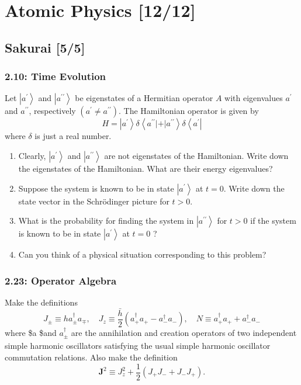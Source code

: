 \documentclass[11pt]{article}
\begin{document}
\section{Atomic Physics [12/12]}
\label{sec:org9dfb86c}
\subsection{Sakurai [5/5]}
\label{sec:orgdc7fe7d}
\subsubsection{2.10: Time Evolution}
\label{sec:org5aea961}
Let \(\left|a^{\prime}\right\rangle\) and \(\left|a^{\prime
\prime}\right\rangle\) be eigenstates of a Hermitian operator \(A\) with
eigenvalues \(a^{\prime}\) and \(a^{\prime \prime}\), respectively \(\left(a^{\prime}
\neq a^{\prime \prime}\right)\). The Hamiltonian operator is given by $$
H=\left|a^{\prime}\right\rangle \delta\left\langle a^{\prime \prime}|+|
a^{\prime \prime}\right\rangle \delta\left\langle a^{\prime}\right| $$ where
\(\delta\) is just a real number.
\begin{enumerate}
\item Clearly, \(\left|a^{\prime}\right\rangle\) and \(\left|a^{\prime
   \prime}\right\rangle\) are not eigenstates of the Hamiltonian. Write down the
eigenstates of the Hamiltonian. What are their energy eigenvalues?
\item Suppose the system is known to be in state \(\left|a^{\prime}\right\rangle\) at
\(t=0\). Write down the state vector in the Schrödinger picture for \(t>0\).
\item What is the probability for finding the system in \(\left|a^{\prime
   \prime}\right\rangle\) for \(t>0\) if the system is known to be in state
\(\left|a^{\prime}\right\rangle\) at \(t=0\) ?
\item Can you think of a physical situation corresponding to this problem?
\end{enumerate}
\subsubsection{2.23: Operator Algebra}
\label{sec:orgc4f9abb}
Make the definitions $$ J_{ \pm} \equiv h a_{ \pm}^{\dagger} a_{\mp}, \quad J_z
\equiv \frac{\bar{h}}{2}\left(a_{+}^{\dagger} a_{+}-a_{-}^{\dagger}
a_{-}\right), \quad N \equiv a_{+}^{\dagger} a_{+}+a_{-}^{\dagger} a_{-} $$
where \$a\textsubscript{ \textpm{}}\$and \(a_{ \pm}^{\dagger}\) are the annihilation and creation
operators of two independent simple harmonic oscillators satisfying the usual
simple harmonic oscillator commutation relations. Also make the definition $$
\mathbf{J}^2 \equiv J_z^2+\frac{1}{2}\left(J_{+} J_{-}+J_{-} J_{+}\right) . $$
\end{document}
